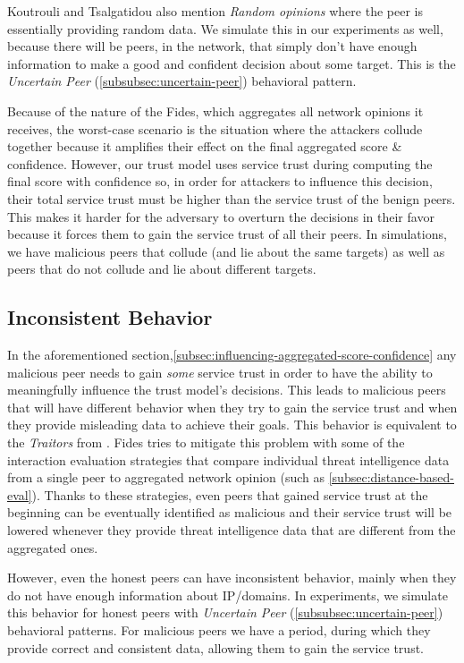 Koutrouli and Tsalgatidou \cite{KOUTROULI201247} also mention \textit{Random opinions} where the peer is essentially providing random data.
We simulate this in our experiments as well, because there will be peers, in the network, that simply don't have enough information to make a good and confident decision about some target.
This is the \textit{Uncertain Peer} (\ref{subsubsec:uncertain-peer}) behavioral pattern.

Because of the nature of the Fides, which aggregates all network opinions it receives, the worst-case scenario is the situation where the attackers collude together because it amplifies their effect on the final aggregated score \& confidence.
However, our trust model uses service trust during computing the final score with confidence so, in order for attackers to influence this decision, their total service trust must be higher than the service trust of the benign peers.
This makes it harder for the adversary to overturn the decisions in their favor because it forces them to gain the service trust of all their peers.
In simulations, we have malicious peers that collude (and lie about the same targets) as well as peers that do not collude and lie about different targets.

\subsection{Inconsistent Behavior}
\label{subsec:inconsistent-behavior}
In the aforementioned section,\ref{subsec:influencing-aggregated-score-confidence} any malicious peer needs to gain \textit{some} service trust in order to have the ability to meaningfully influence the trust model's decisions.
This leads to malicious peers that will have different behavior when they try to gain the service trust and when they provide misleading data to achieve their goals.
This behavior is equivalent to the \textit{Traitors} from \cite{KOUTROULI201247}.
Fides tries to mitigate this problem with some of the interaction evaluation strategies that compare individual threat intelligence data from a single peer to aggregated network opinion (such as \ref{subsec:distance-based-eval}).
Thanks to these strategies, even peers that gained service trust at the beginning can be eventually identified as malicious and their service trust will be lowered whenever they provide threat intelligence data that are different from the aggregated ones.

However, even the honest peers can have inconsistent behavior, mainly when they do not have enough information about IP/domains.
In experiments, we simulate this behavior for honest peers with \textit{Uncertain Peer} (\ref{subsubsec:uncertain-peer}) behavioral patterns.
For malicious peers we have a period, during which they provide correct and consistent data, allowing them to gain the service trust. 

